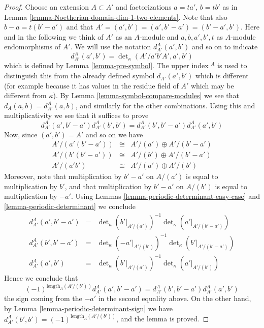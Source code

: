 \begin{proof}
\medskip\noindent
Choose an extension $A \subset A'$ and factorizations
$a = ta'$, $b = tb'$ as in
Lemma \ref{lemma-Noetherian-domain-dim-1-two-elements}.
Note that also $b - a = t(b' - a')$ and that
$A' = (a', b') = (a', b' - a') = (b' - a', b')$.
Here and in the following we think of $A'$ as an $A$-module and
$a, b, a', b', t$ as $A$-module endomorphisms of $A'$.
We will use the notation $d^A_{A'}(a', b')$ and so on to indicate
$$
d^A_{A'}(a', b')
=
\det\nolimits_\kappa(A'/a'b'A', a', b')
$$
which is defined by Lemma \ref{lemma-pre-symbol}. The upper index ${}^A$
is used to distinguish this from the already defined symbol
$d_{A'}(a', b')$ which is different (for example because it has values
in the residue field of $A'$ which may be different from $\kappa$).
By Lemma \ref{lemma-symbol-compare-modules} we see that
$d_A(a, b) = d^A_{A'}(a, b)$,
and similarly for the other combinations.
Using this and multiplicativity we see that it suffices to prove
$$
d^A_{A'}(a', b' - a') d^A_{A'}(b', b')
=
d^A_{A'}(b', b' - a') d^A_{A'}(a', b')
$$
Now, since $(a', b') = A'$ and so on we have
$$
\begin{matrix}
A'/(a'(b' - a')) & \cong & A'/(a') \oplus A'/(b' - a') \\
A'/(b'(b' - a')) & \cong & A'/(b') \oplus A'/(b' - a') \\
A'/(a'b') & \cong & A'/(a') \oplus A'/(b')
\end{matrix}
$$
Moreover, note that multiplication by $b' - a'$ on
$A/(a')$ is equal to multiplication by $b'$, and that
multiplication by $b' - a'$ on $A/(b')$ is equal to multiplication by $-a'$.
Using Lemmas
\ref{lemma-periodic-determinant-easy-case} and
\ref{lemma-periodic-determinant}
we conclude
$$
\begin{matrix}
d^A_{A'}(a', b' - a') & = &
\det\nolimits_\kappa(b'|_{A'/(a')})^{-1}
\det\nolimits_\kappa(a'|_{A'/(b' - a')}) \\
d^A_{A'}(b', b' - a') & = &
\det\nolimits_\kappa(-a'|_{A'/(b')})^{-1}
\det\nolimits_\kappa(b'|_{A'/(b' - a')}) \\
d^A_{A'}(a', b') & = &
\det\nolimits_\kappa(b'|_{A'/(a')})^{-1}
\det\nolimits_\kappa(a'|_{A'/(b')})
\end{matrix}
$$
Hence we conclude that
$$
(-1)^{\text{length}_A(A'/(b'))}
d^A_{A'}(a', b' - a')
=
d^A_{A'}(b', b' - a') d^A_{A'}(a', b')
$$
the sign coming from the $-a'$ in the second equality above.
On the other hand, by Lemma \ref{lemma-periodic-determinant-sign} we have
$d^A_{A'}(b', b') = (-1)^{\text{length}_A(A'/(b'))}$, and the lemma
is proved.
\end{proof}

